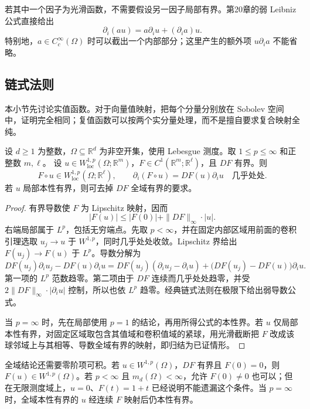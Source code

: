 若其中一个因子为光滑函数，不需要假设另一因子局部有界。第20章的弱 Leibniz 公式直接给出
\[
 \partial_i(au)=a\partial_i u+(\partial_i a)u.
\]
特别地，\(a\in C_c^\infty(\Omega)\) 时可以截出一个内部部分；这里产生的额外项 \(u\partial_i a\) 不能省略。

\subsection{链式法则}
\label{b1:subsec:210302}

本小节先讨论实值函数。对于向量值映射，把每个分量分别放在 Sobolev 空间中，证明完全相同；复值函数可以按两个实分量处理，而不是擅自要求复合映射全纯。

\begin{theorem}[链式法则]\label{b1:thm:sobolev-chain}
设 \(d\geq1\) 为整数，\(\Omega\subseteq\mathbb R^d\) 为非空开集，使用 Lebesgue 测度。取 \(1\leq p\leq\infty\) 和正整数 \(m,\ell\)。
设 \(u\in W^{1,p}_{\mathrm{loc}}(\Omega;\mathbb R^m)\)，\(F\in C^1(\mathbb R^m;\mathbb R^\ell)\)，且 \(DF\) 有界。则
\[
 F\circ u\in W^{1,p}_{\mathrm{loc}}(\Omega;\mathbb R^\ell),
 \qquad
 \partial_i(F\circ u)=DF(u)\partial_i u
 \quad\text{几乎处处}.
\]
若 \(u\) 局部本性有界，则可去掉 \(DF\) 全域有界的要求。
\end{theorem}
\begin{proof}
有界导数使 \(F\) 为 Lipschitz 映射，因而
\[
 |F(u)|\le |F(0)|+\|DF\|_\infty\cdot|u|.
\]
右端局部属于 \(L^p\)，包括无穷端点。先取 \(p<\infty\)，并在固定内部区域用前面的卷积引理选取 \(u_j\to u\) 于 \(W^{1,p}\)，同时几乎处处收敛。Lipschitz 界给出 \(F(u_j)\to F(u)\) 于 \(L^p\)。导数分解为
\[
 DF(u_j)\partial_i u_j-DF(u)\partial_i u
 =DF(u_j)(\partial_i u_j-\partial_i u)
   +\bigl(DF(u_j)-DF(u)\bigr)\partial_i u.
\]
第一项的 \(L^p\) 范数趋零。第二项由于 \(DF\) 连续而几乎处处趋零，并受 \(2\|DF\|_\infty\cdot|\partial_i u|\) 控制，所以也依 \(L^p\) 趋零。经典链式法则在极限下给出弱导数公式。

当 \(p=\infty\) 时，先在局部使用 \(p=1\) 的结论，再用所得公式的本性界。若 \(u\) 仅局部本性有界，对固定区域取包含其值域和卷积值域的紧球，用光滑截断把 \(F\) 改成该球邻域上与其相等、导数全域有界的映射，即归结为已证情形。
\end{proof}

全域结论还需要零阶项可积。若 \(u\in W^{1,p}(\Omega)\)，\(DF\) 有界且 \(F(0)=0\)，则 \(F(u)\in W^{1,p}(\Omega)\)。若 \(p<\infty\) 且 \(m_d(\Omega)<\infty\)，允许 \(F(0)\ne0\) 也可以；但在无限测度域上，\(u=0\)、\(F(t)=1+t\) 已经说明不能遗漏这个条件。当 \(p=\infty\) 时，全域本性有界的 \(u\) 经连续 \(F\) 映射后仍本性有界。

